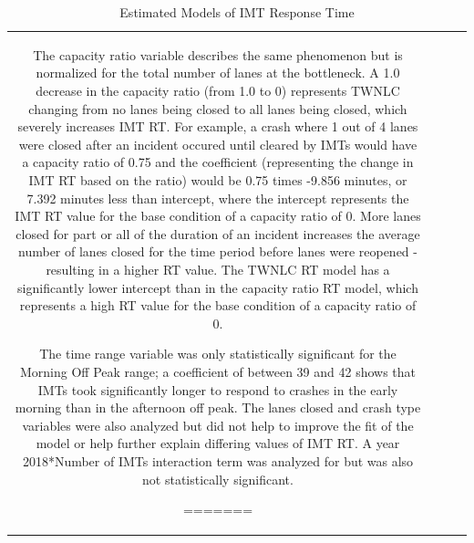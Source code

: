 \documentclass[
  letterpaper,
  authoryear]{elsarticle}
\begin{document}
\begin{table}
{\begin{tabular}[t]{c|c|c|c}
The capacity ratio variable describes the same phenomenon but is
normalized for the total number of lanes at the bottleneck. A 1.0
decrease in the capacity ratio (from 1.0 to 0) represents TWNLC changing
from no lanes being closed to all lanes being closed, which severely
increases IMT RT. For example, a crash where 1 out of 4 lanes were
closed after an incident occured until cleared by IMTs would have a
capacity ratio of 0.75 and the coefficient (representing the change in
IMT RT based on the ratio) would be 0.75 times -9.856 minutes, or 7.392
minutes less than intercept, where the intercept represents the IMT RT
value for the base condition of a capacity ratio of 0. More lanes closed
for part or all of the duration of an incident increases the average
number of lanes closed for the time period before lanes were reopened -
resulting in a higher RT value. The TWNLC RT model has a significantly
lower intercept than in the capacity ratio RT model, which represents a
high RT value for the base condition of a capacity ratio of 0.

The time range variable was only statistically significant for the
Morning Off Peak range; a coefficient of between 39 and 42 shows that
IMTs took significantly longer to respond to crashes in the early
morning than in the afternoon off peak. The lanes closed and crash type
variables were also analyzed but did not help to improve the fit of the
model or help further explain differing values of IMT RT. A year
2018*Number of IMTs interaction term was analyzed for but was also not
statistically significant.

\begin{table}

\caption{\label{tbl-rtmodels}Estimated Models of IMT RT}
=======
\begin{table}

\caption{\label{tbl-rtmodels}Estimated Models of IMT Response Time}

\centering{

}
\end{table}
\end{table}
\end{tabular}}
\end{table}
\end{document}
